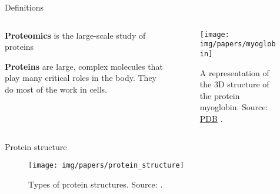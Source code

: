 \documentclass[10pt]{beamer}
\newcommand{\chref}[2]{	\href{#1}{{\usebeamercolor[bg]{Feather}#2}} }
\newcommand{\chref}[3][blue]{\href{#2}{\color{#1}{#3}}}%
\newcommand{\1}{
        	\setbeamertemplate{background}{
        		\texttt{[image: img/1]}
        		\tikz[overlay] \fill[fill opacity=0.75,fill=white] (0,0) rectangle (-\paperwidth,\paperheight);
        	}
}
\begin{document}
\begin{frame}{Definitions}{}	
	
	\begin{columns}
		\begin{column}{0.48\textwidth}
			
			\begin{block}{}
				\textbf{Proteomics} is the large-scale study of proteins \cite{anderson1998proteome}
			\end{block}
		
			\begin{block}{}
				\textbf{Proteins} are large, complex molecules that play many critical roles in the body. They do most of the work in cells. \cite{anderson1998proteome}
			\end{block}

		\end{column}
	
		\begin{column}{0.48\textwidth}
		
			\begin{figure}
				\centering
				\texttt{[image: img/papers/myoglobin]}
				\caption{A representation of the 3D structure of the protein myoglobin. Source: \chref{https://pdb101.rcsb.org/motm/1}{PDB}.}
			\end{figure}	
		
		\end{column}
	\end{columns}	
		
\end{frame}

\begin{frame}{Protein structure}{}	
	
	\begin{figure}
		\centering
		\texttt{[image: img/papers/protein\_structure]}
		\caption{Types of protein structures. Source: \cite{russell2002igenetics}.}
	\end{figure}
	
\end{frame}
\end{document}
